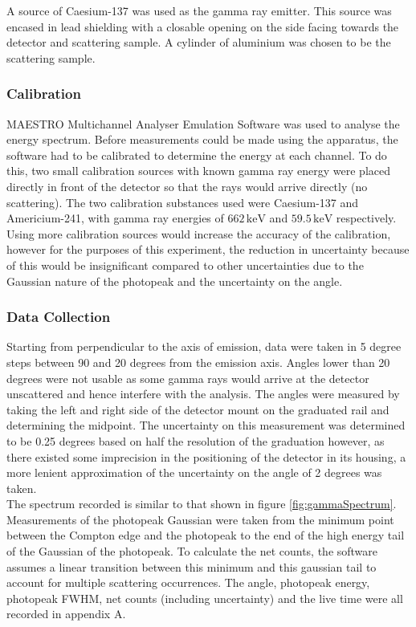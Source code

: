 \documentclass[%
reprint,
amsmath,amssymb,
aps,
]{revtex4-2}
\begin{document}
			A source of Caesium-137 was used as the gamma ray emitter. This source was encased in lead shielding with a closable opening on the side facing towards the detector and scattering sample. A cylinder of aluminium was chosen to be the scattering sample.
			
			\subsubsection{Calibration}			
			
			MAESTRO Multichannel Analyser Emulation Software was used to analyse the energy spectrum. Before measurements could be made using the apparatus, the software had to be calibrated to determine the energy at each channel. To do this, two small calibration sources with known gamma ray energy were placed directly in front of the detector so that the rays would arrive directly (no scattering). The two calibration substances used were Caesium-137 and Americium-241, with gamma ray energies of $662 \,\text{keV}$ and $59.5 \,\text{keV}$ respectively. Using more calibration sources would increase the accuracy of the calibration, however for the purposes of this experiment, the reduction in uncertainty because of this would be insignificant compared to other uncertainties due to the Gaussian nature of the photopeak and the uncertainty on the angle.\\
			
			\subsubsection{Data Collection}			
			
			Starting from perpendicular to the axis of emission, data were taken in 5 degree steps between 90 and 20 degrees from the emission axis. Angles lower than 20 degrees were not usable as some gamma rays would arrive at the detector unscattered and hence interfere with the analysis. The angles were measured by taking the left and right side of the detector mount on the graduated rail and determining the midpoint. The uncertainty on this measurement was determined to be 0.25 degrees based on half the resolution of the graduation however, as there existed some imprecision in the positioning of the detector in its housing, a more lenient approximation of the uncertainty on the angle of 2 degrees was taken.\\
			
			The spectrum recorded is similar to that shown in figure \ref{fig:gammaSpectrum}. Measurements of the photopeak Gaussian were taken from the minimum point between the Compton edge and the photopeak to the end of the high energy tail of the Gaussian of the photopeak. To calculate the net counts, the software assumes a linear transition between this minimum and this gaussian tail to account for multiple scattering occurrences. The angle, photopeak energy, photopeak FWHM, net counts (including uncertainty) and the live time were all recorded in appendix A.
			
\end{document}
